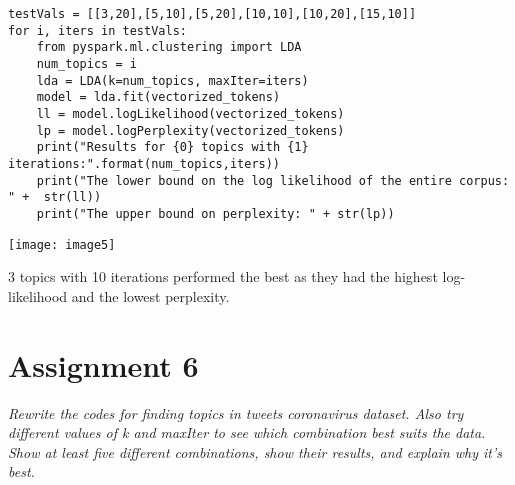 \documentclass[]{article}
\begin{document}
\begin{verbatim}
testVals = [[3,20],[5,10],[5,20],[10,10],[10,20],[15,10]]
for i, iters in testVals:
	from pyspark.ml.clustering import LDA
	num_topics = i
	lda = LDA(k=num_topics, maxIter=iters)
	model = lda.fit(vectorized_tokens)
	ll = model.logLikelihood(vectorized_tokens)
	lp = model.logPerplexity(vectorized_tokens)
	print("Results for {0} topics with {1} iterations:".format(num_topics,iters))
	print("The lower bound on the log likelihood of the entire corpus: " +  str(ll))
	print("The upper bound on perplexity: " + str(lp))
\end{verbatim}
\texttt{[image: image5]} %

3 topics with 10 iterations performed the best as they had the highest log-likelihood and the lowest perplexity.

\clearpage

\section*{Assignment 6}
\emph{ Rewrite the codes for finding topics in tweets coronavirus dataset.  Also try different values of k and maxIter to see which combination best suits the data. Show at least five different combinations, show their results, and explain why it’s best.
 }
\end{document}
